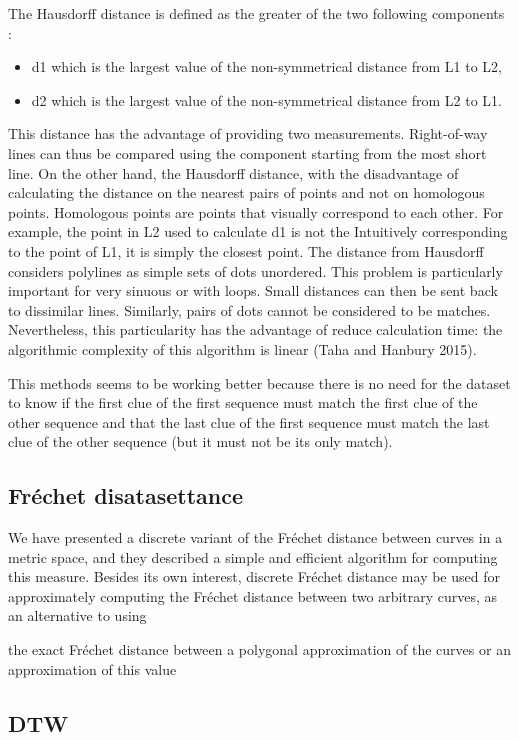 \documentclass{article}
\begin{document}
The Hausdorff distance is defined as the greater of the two following components :
\begin{itemize}
    \item d1 which is the largest value of the non-symmetrical distance from L1 to L2,
    \item d2 which is the largest value of the non-symmetrical distance from L2 to L1.
\end{itemize}


This distance has the advantage of providing two measurements. Right-of-way lines can thus be compared using the component starting from the most short line. On the other hand, the Hausdorff distance, with the disadvantage of calculating the
distance on the nearest pairs of points and not on homologous points. Homologous points are points that visually correspond to each other. For example, the point in L2 used to calculate d1 is not the Intuitively corresponding to the point of L1, it is simply the closest point. The distance from Hausdorff considers polylines as simple sets of dots unordered. This problem is particularly important for very sinuous or with loops. Small distances can then be sent back to dissimilar lines. Similarly, pairs of dots cannot be considered to be matches. Nevertheless, this particularity has the advantage of
reduce calculation time: the algorithmic complexity of this algorithm is linear (Taha and Hanbury 2015). 


This methods seems to be working better because there is no need for the dataset to know if the first clue of the first sequence must match the first clue of the other sequence and that
the last clue of the first sequence must match the last clue of the other sequence (but it must not be its only match).

\subsection{Fréchet disatasettance}
We have presented a discrete variant of the Fréchet distance between curves in a metric
space, and they described a simple and efficient algorithm for computing this measure.
Besides its own interest, discrete Fréchet distance may be used for approximately computing the Fréchet distance between two arbitrary curves, as an alternative to using

the exact Fréchet distance between a polygonal approximation of the curves or an approximation of this value

\subsection{DTW}
\end{document}
